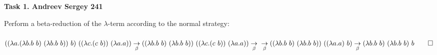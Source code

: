\documentclass[12pt]{article}
\begin{document}
 
\begin{center} 
\textbf{Task 1. Andreev Sergey 241}\\ 
\end{center} 
Perform a beta-reduction of the $\lambda$-term according to the normal strategy:\\ 
\\ 
$((\lambda a.(\lambda b.b \ b)\ (\lambda b.b \ b))\ b)\ ((\lambda c.(c \ b)) \ (\lambda a.a)) \underset{\beta}{\to} 
((\lambda b.b \ b)\ (\lambda b.b \ b)) \ ((\lambda c.(c \ b)) \ (\lambda a.a)) \underset{\beta}{\to}\\ 
\underset{\beta}{\to}((\lambda b.b \ b)\ (\lambda b.b \ b)) \ ((\lambda a.a) \ b)
\underset{\beta}{\to}(\lambda b.b \ b)\ (\lambda b.b \ b) \ b\qed$ 
\end{document}
